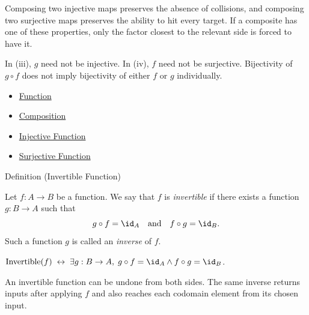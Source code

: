 \begin{remark*}[Interpretation]
Composing two injective maps preserves the absence of collisions, and composing
two surjective maps preserves the ability to hit every target. If a composite
has one of these properties, only the factor closest to the relevant side is
forced to have it.
\end{remark*}

\begin{remark*}[Exposition]
In (iii), $g$ need not be injective. In (iv), $f$ need not be surjective.
Bijectivity of $g \circ f$ does not imply bijectivity of either $f$ or $g$
individually.
\end{remark*}

\begin{dependencies}
\begin{itemize}
  \item \hyperref[def:function]{Function}
  \item \hyperref[def:composition]{Composition}
  \item \hyperref[def:injective]{Injective Function}
  \item \hyperref[def:surjective]{Surjective Function}
\end{itemize}
\end{dependencies}

\begin{definitionbox}{Definition (Invertible Function)}
\begin{definition}\label{def:invertible-function}
Let $f : A \to B$ be a function. We say that $f$ is \emph{invertible} if
there exists a function $g : B \to A$ such that
\[
g \circ f = \id_A
\quad\text{and}\quad
f \circ g = \id_B.
\]
Such a function $g$ is called an \emph{inverse} of $f$.
\end{definition}
\end{definitionbox}

\begin{remark*}
$\operatorname{Invertible}(f)\;\leftrightarrow\;\exists g:B\to A,\;
g\circ f=\id_A \wedge f\circ g=\id_B$.
\end{remark*}

\begin{remark*}[Interpretation]
An invertible function can be undone from both sides. The same inverse returns
inputs after applying $f$ and also reaches each codomain element from its chosen
input.
\end{remark*}

